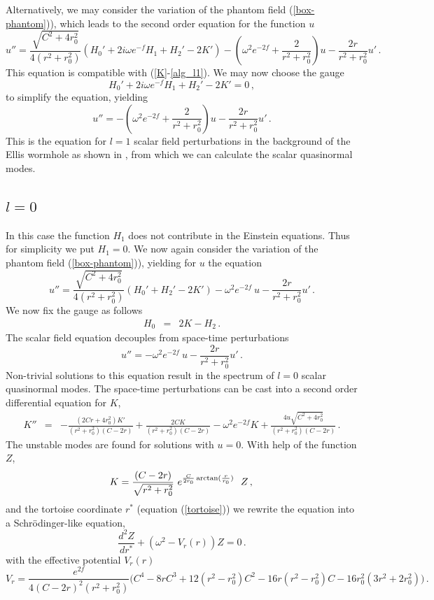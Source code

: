 \documentclass[a4paper,12pt]{article}
\newcommand{\be}{\begin{equation}}
\newcommand{\ee}{\end{equation}}
\newcommand{\bea}{\begin{eqnarray}}
\newcommand{\eea}{\end{eqnarray}}
\begin{document}
Alternatively, we may consider the variation of the phantom field (\ref{box-phantom})), which leads to the second order equation for the function $u$
   \be
   u''=\frac{\sqrt{C^2+4r_0^2}}{4(r^2+r_0^2)}\left(H_0'+2i\omega e^{-f}H_1+H_2'-2K'\right)-\left(\omega^2e^{-2f}+\frac{2}{r^2+r_0^2}\right)u-\frac{2{r}}{r^2+r_0^2}u' \,.
   \ee
This equation is compatible with (\ref{K}-\ref{alg_l1}).
We may now choose the gauge
   \be 
   H_0'+2i\omega e^{-f}H_1+H_2'-2K'=0 \,,
   \ee 
to simplify the equation, yielding
   \be
   u''=-\left(\omega^2e^{-2f}+\frac{2}{r^2+r_0^2}\right)u-\frac{2{r}}{r^2+r_0^2}u'\,.
   \label{eq_sc_l1}
   \ee
This is the equation for $l=1$ scalar field perturbations in the background of the Ellis wormhole as shown in %
\cite{Blazquez-Salcedo:2018ipc}, from which we can calculate the scalar quasinormal modes.

     
\subsection{$l=0$}     

 
In this case %
the function $H_1$ does not contribute in the Einstein equations. 
Thus for simplicity we put $H_1=0$. 
We now again consider the variation of the phantom field (\ref{box-phantom})), yielding for $u$ the equation
     \be  
     u''=\frac{\sqrt{C^2+4r_0^2}}{4(r^2+r_0^2)}\left(H_0'+H_2'-2K'\right)-\omega^2 e^{-2f}\ u -\frac{2r}{r^2+r_0^2}u' \,.
     \ee         
We now fix the gauge as follows
   \bea  
   H_0&=&2K-H_2 \,.
   \eea 
The scalar field equation decouples from space-time perturbations
     \be  
     u''=-\omega^2 e^{-2f}\ u -\frac{2r}{r^2+r_0^2}u' \,.
        \label{eq_sc_l0}
     \ee  
Non-trivial solutions to this equation result in the spectrum of $l=0$ scalar quasinormal modes.
The space-time perturbations can be cast into a second order differential equation for $K$,
     \bea  
     K''&=&-\frac{(2Cr+4r_0^2)K'}{(r^2+r_0^2)(C-2r)} + \frac{2CK}{(r^2+r_0^2)(C-2r)} - \omega^2 e^{-2f} K + \frac{4u\sqrt{C^2+4r_0^2}}{(r^2+r_0^2)(C-2r)} \,.
     \eea 
%  
%
The unstable modes are found for solutions with $u=0$. 
With help of the function $Z$,
      \be       
      K=\frac{(C-2r)}{\sqrt{r^2+r_0^2}}\ e^{\frac{C}{2r_0}\arctan(\frac{r}{r_0})}\ \ Z \,,\\
      \ee 
and the tortoise coordinate $r^*$ (equation (\ref{tortoise}))
%  
we rewrite the equation into a Schr\"odinger-like equation,
     \be   
    \frac{d^2Z}{dr^*}+\left(\omega^2-V_r(r)\right)Z=0 \,.
    \label{eq_rad_pert}
    \ee 
with the effective potential $V_r(r)$
    \be    
   V_r= \frac{e^{2f}}{4(C-2r)^2(r^2+r_0^2)}\Big(C^4-8rC^3+12(r^2-r_0^2)C^2-16r(r^2-r_0^2)C-16r_0^2(3r^2+2r_0^2)\Big) \,.
    \ee
     
\end{document}
